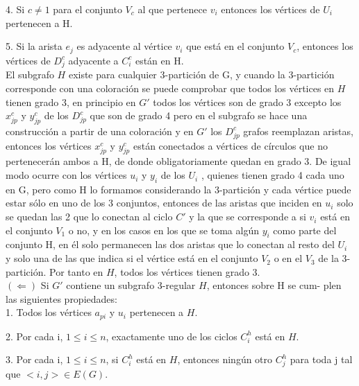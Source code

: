 \documentclass[
10pt, %
a4paper, %
oneside, %
headinclude,footinclude, %
BCOR5mm, %
]{scrartcl}
\begin{document}
4. Si $ c \neq 1$ para el conjunto $V_c$ al que pertenece $v_i$ entonces los vértices de $U_i$ pertenecen a H.

5. Si la arista $e_j$ es adyacente al v\'ertice $v_i$ que est\'a en el conjunto $V_c$, entonces los v\'ertices de $D^c_j$ adyacente a $C^c_i$ est\'an en H. \\


El subgrafo $H$ existe para cualquier 3-partición de G, y cuando la 3-partición corresponde con una coloración se puede comprobar que todos los vértices en
$H$ tienen grado 3, en principio en $G'$ todos los vértices son de grado 3 excepto los $x_{jp}^{c}$ y $y_{jp}^{c}$ de los $D_{jp}^{c}$ que son de grado 4 pero en el subgrafo se hace 
una construcción a partir de una coloración y en $G'$ los $D_{jp}^{c}$ grafos reemplazan aristas, entonces los vértices $x_{jp}^{c}$ y $y_{jp}^{c}$ están conectados a vértices de círculos que
no pertenecerán ambos a H, de donde obligatoriamente quedan en grado 3. De
igual modo ocurre con los vértices $u_i$ y $y_i$ de los $U_i$ , quienes tienen grado 4 cada uno en G, pero como H lo formamos considerando la 3-partición y cada vértice
puede estar sólo en uno de los 3 conjuntos, entonces de las aristas que inciden
en $u_i$ solo se quedan las 2 que lo conectan al ciclo $C'$ y la que se corresponde a
si $v_i$ está en el conjunto $V_1$ o no, y en los casos en los que se toma algún $y_i$ como
parte del conjunto H, en él solo permanecen las dos aristas que lo conectan
al resto del $U_i$ y solo una de las que indica si el vértice está en el conjunto $V_2$
o en el $V_3$ de la 3-partición. Por tanto en $H$, todos los vértices tienen grado 3. \\


$(\Leftarrow )$ Si $G'$ contiene un subgrafo 3-regular $H$, entonces sobre H se cum-
plen las siguientes propiedades: \\


1. Todos los vértices $a_{pi}$ y $u_i$ pertenecen a $H$.

2. Por cada i, $1 \leq i \leq n$, exactamente uno de los ciclos $C^h_i$ está en $H$.

3. Por cada i, $1 \leq i \leq n$, si $C^h_i$ está en $H$, entonces ningún otro $C^h_j$ para
toda j tal que $< i, j > \in E(G)$. \\
\end{document}
